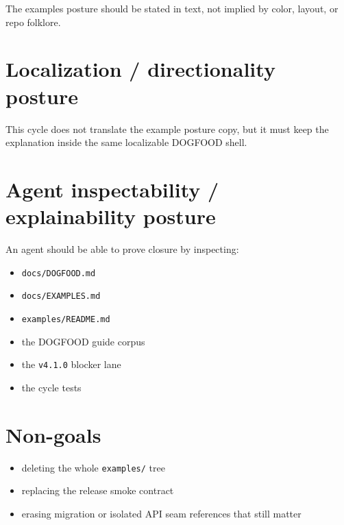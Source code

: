 The examples posture should be stated in text, not implied by color, layout, or repo folklore.

\section{Localization / directionality posture}\label{record-087-localization-directionality-posture}

This cycle does not translate the example posture copy, but it must keep the explanation inside the same localizable DOGFOOD shell.

\section{Agent inspectability / explainability posture}\label{record-087-agent-inspectability-explainability-posture}

An agent should be able to prove closure by inspecting:

\begin{itemize}
\tightlist
\item
  \texttt{d\allowbreak{}o\allowbreak{}c\allowbreak{}s\allowbreak{}/\allowbreak{}D\allowbreak{}O\allowbreak{}G\allowbreak{}F\allowbreak{}O\allowbreak{}O\allowbreak{}D\allowbreak{}.\allowbreak{}m\allowbreak{}d}
\item
  \texttt{d\allowbreak{}o\allowbreak{}c\allowbreak{}s\allowbreak{}/\allowbreak{}E\allowbreak{}X\allowbreak{}A\allowbreak{}M\allowbreak{}P\allowbreak{}L\allowbreak{}E\allowbreak{}S\allowbreak{}.\allowbreak{}m\allowbreak{}d}
\item
  \texttt{e\allowbreak{}x\allowbreak{}a\allowbreak{}m\allowbreak{}p\allowbreak{}l\allowbreak{}e\allowbreak{}s\allowbreak{}/\allowbreak{}R\allowbreak{}E\allowbreak{}A\allowbreak{}D\allowbreak{}M\allowbreak{}E\allowbreak{}.\allowbreak{}m\allowbreak{}d}
\item
  the DOGFOOD guide corpus
\item
  the \texttt{v\allowbreak{}4\allowbreak{}.\allowbreak{}1\allowbreak{}.\allowbreak{}0} blocker lane
\item
  the cycle tests
\end{itemize}

\section{Non-goals}\label{record-087-non-goals}

\begin{itemize}
\tightlist
\item
  deleting the whole \texttt{e\allowbreak{}x\allowbreak{}a\allowbreak{}m\allowbreak{}p\allowbreak{}l\allowbreak{}e\allowbreak{}s\allowbreak{}/} tree
\item
  replacing the release smoke contract
\item
  erasing migration or isolated API seam references that still matter
\end{itemize}

